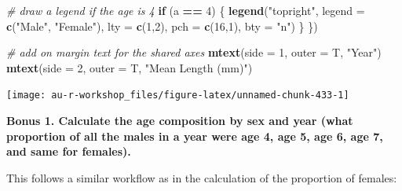 \documentclass[]{book}
\newenvironment{Shaded}{\begin{snugshade}}{\end{snugshade}}
\newcommand{\CommentTok}[1]{\textcolor[rgb]{0.56,0.35,0.01}{\textit{#1}}}
\newcommand{\ControlFlowTok}[1]{\textcolor[rgb]{0.13,0.29,0.53}{\textbf{#1}}}
\newcommand{\DataTypeTok}[1]{\textcolor[rgb]{0.13,0.29,0.53}{#1}}
\newcommand{\DecValTok}[1]{\textcolor[rgb]{0.00,0.00,0.81}{#1}}
\newcommand{\KeywordTok}[1]{\textcolor[rgb]{0.13,0.29,0.53}{\textbf{#1}}}
\newcommand{\NormalTok}[1]{#1}
\newcommand{\OperatorTok}[1]{\textcolor[rgb]{0.81,0.36,0.00}{\textbf{#1}}}
\newcommand{\StringTok}[1]{\textcolor[rgb]{0.31,0.60,0.02}{#1}}
\begin{document}
\begin{Shaded}
\begin{Highlighting}[]
  \CommentTok{# draw a legend if the age is 4}
  \ControlFlowTok{if}\NormalTok{ (a }\OperatorTok{==}\StringTok{ }\DecValTok{4}\NormalTok{) \{}
    \KeywordTok{legend}\NormalTok{(}\StringTok{"topright"}\NormalTok{, }\DataTypeTok{legend =} \KeywordTok{c}\NormalTok{(}\StringTok{"Male"}\NormalTok{, }\StringTok{"Female"}\NormalTok{),}
           \DataTypeTok{lty =} \KeywordTok{c}\NormalTok{(}\DecValTok{1}\NormalTok{,}\DecValTok{2}\NormalTok{), }\DataTypeTok{pch =} \KeywordTok{c}\NormalTok{(}\DecValTok{16}\NormalTok{,}\DecValTok{1}\NormalTok{), }\DataTypeTok{bty =} \StringTok{"n"}\NormalTok{)}
\NormalTok{  \}}
\NormalTok{\})}

\CommentTok{# add on margin text for the shared axes}
\KeywordTok{mtext}\NormalTok{(}\DataTypeTok{side =} \DecValTok{1}\NormalTok{, }\DataTypeTok{outer =}\NormalTok{ T, }\StringTok{"Year"}\NormalTok{)}
\KeywordTok{mtext}\NormalTok{(}\DataTypeTok{side =} \DecValTok{2}\NormalTok{, }\DataTypeTok{outer =}\NormalTok{ T, }\StringTok{"Mean Length (mm)"}\NormalTok{)}
\end{Highlighting}
\end{Shaded}

\begin{center}\texttt{[image: au-r-workshop\_files/figure-latex/unnamed-chunk-433-1]} \end{center}

\textbf{Bonus 1. Calculate the age composition by sex and year (what proportion of all the males in a year were age 4, age 5, age 6, age 7, and same for females).}

This follows a similar workflow as in the calculation of the proportion of females:

\begin{Shaded}
\end{Shaded}
\end{document}
